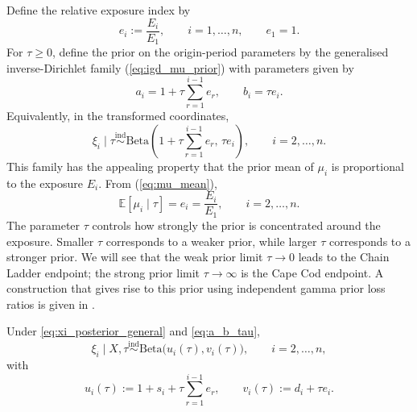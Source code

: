 \documentclass[11pt]{article}
\newcommand{\E}{\mathbb{E}}
\newcommand{\1}{\mathbf{1}}
\newcommand{\BetaD}{\mathrm{Beta}}
\begin{document}
Define the relative exposure index by
\begin{equation}
e_i:=\frac{E_i}{E_1},
\qquad i=1,\dots,n,
\qquad e_1=1.
\label{eq:relative_exposure_def}
\end{equation}
For $\tau\ge0$, define the prior on the origin-period parameters by the generalised inverse-Dirichlet family (\ref{eq:igd_mu_prior}) with 
parameters given by 
\begin{equation}
a_i=1+\tau\sum_{r=1}^{i-1}e_r,
\qquad
b_i=\tau e_i.
\label{eq:a_b_tau}
\end{equation}
Equivalently, in the transformed coordinates,
\begin{equation}
\xi_i\mid\tau \stackrel{\mathrm{ind}}{\sim}
\BetaD\!\left(
1+\tau\sum_{r=1}^{i-1}e_r,\,\tau e_i
\right),
\qquad i=2,\dots,n.
\label{eq:xi_prior_tau}
\end{equation}
This family has the appealing property that the prior mean of $\mu_i$ is proportional to the exposure $E_i$. From (\ref{eq:mu_mean}), 
\begin{equation}
\E[\mu_i\mid\tau]=e_i=\frac{E_i}{E_1},
\qquad i=2,\dots,n.
\label{eq:mu_mean_tau}
\end{equation}
The parameter $\tau$ controls how strongly the prior is concentrated around the exposure. Smaller $\tau$ corresponds to a 
weaker prior, while larger $\tau$ corresponds to a stronger prior. We will see that the weak prior limit $\tau\rightarrow 0$ leads to the Chain Ladder endpoint; the strong prior limit $\tau\to\infty$ is the Cape Cod endpoint.
A construction that gives rise to this prior using independent gamma prior loss ratios is given in .

Under \eqref{eq:xi_posterior_general} and \eqref{eq:a_b_tau},
\begin{equation}
\xi_i\mid X,\tau \stackrel{\mathrm{ind}}{\sim}
\BetaD\!\bigl(u_i(\tau),v_i(\tau)\bigr),
\qquad i=2,\dots,n,
\label{eq:xi_posterior_tau}
\end{equation}
with
\begin{equation}
u_i(\tau):=1+s_i+\tau\sum_{r=1}^{i-1}e_r,
\qquad
v_i(\tau):=d_i+\tau e_i.
\label{eq:u_v_tau}
\end{equation}
\end{document}
